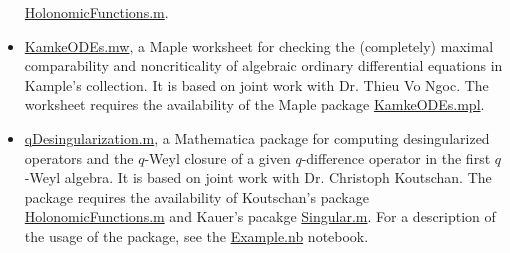 \documentclass[a4paper,12pt]{article}
\begin{document}
\begin{itemize}
     \href{http://www.risc.jku.at/research/combinat/software/ergosum/RISC/HolonomicFunctions.html}{HolonomicFunctions.m}.
  \item \href{https://yzhang1616.github.io/KamkeODEs.mw}{KamkeODEs.mw}, a Maple worksheet for 
     checking the (completely) maximal comparability and noncriticality of algebraic
     ordinary differential equations in
     Kample's collection. It is based on joint work with Dr. Thieu Vo Ngoc. 
     The worksheet requires the availability of the Maple package \href{https://yzhang1616.github.io/KamkeODEs.mpl}{KamkeODEs.mpl}.
 \item \href{https://yzhang1616.github.io/qDesingularization.m}{qDesingularization.m}, a Mathematica
     package for computing desingularized operators and the $q$-Weyl closure of
     a given $q$-difference operator in
     the first $q$-Weyl algebra. It is based on joint work with Dr. Christoph
     Koutschan. The package requires the availability of Koutschan's package
     \href{http://www.risc.jku.at/research/combinat/software/ergosum/RISC/HolonomicFunctions.html}{HolonomicFunctions.m}
     and Kauer's pacakge \href{https://www.risc.jku.at/research/combinat/risc/software/Singular/index.html}{Singular.m}.
     For a description of the usage of the package, see the \href{https://yzhang1616.github.io/Example.nb}{Example.nb} notebook.
\end{itemize}
\end{document}
